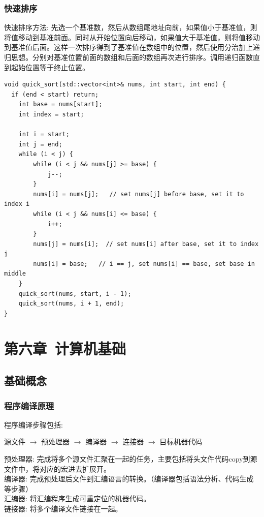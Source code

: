 \documentclass[12pt]{book}
\begin{document}
\subsection{快速排序}
快速排序方法:
先选一个基准数，然后从数组尾地址向前，如果值小于基准值，则将值移动到基准前面。同时从开始位置向后移动，如果值大于基准值，则将值移动到基准值后面。这样一次排序得到了基准值在数组中的位置，然后使用分治加上递归思想。分别对基准位置前面的数组和后面的数组再次进行排序。调用递归函数直到起始位置等于终止位置。
\begin{lstlisting}
void quick_sort(std::vector<int>& nums, int start, int end) {
  if (end < start) return;
	int base = nums[start];
	int index = start;
		
	int i = start;
	int j = end;
	while (i < j) {
		while (i < j && nums[j] >= base) {
			j--;
		}
		nums[i] = nums[j];   // set nums[j] before base, set it to index i
		while (i < j && nums[i] <= base) {
			i++;
		}
		nums[j] = nums[i];  // set nums[i] after base, set it to index j
		nums[i] = base;   // i == j, set nums[i] == base, set base in middle
	}
	quick_sort(nums, start, i - 1);
	quick_sort(nums, i + 1, end);
}
\end{lstlisting}

\newpage

\fancyhead{}

\chapter{第六章\ 计算机基础}
\section{基础概念}
\subsection{程序编译原理}
程序编译步骤包括:
 \begin{center} 源文件 $\rightarrow$ 预处理器 $\rightarrow$ 编译器 $\rightarrow$ 连接器 $\rightarrow$ 目标机器代码 \end{center}
预处理器: 完成将多个源文件汇聚在一起的任务，主要包括将头文件代码copy到源文件中，将对应的宏进去扩展开。\\
编译器: 完成预处理后文件到汇编语言的转换。（编译器包括语法分析、代码生成等步骤）\\
汇编器: 将汇编程序生成可重定位的机器代码。\\
链接器: 将多个编译文件链接在一起。\\
\end{document}

